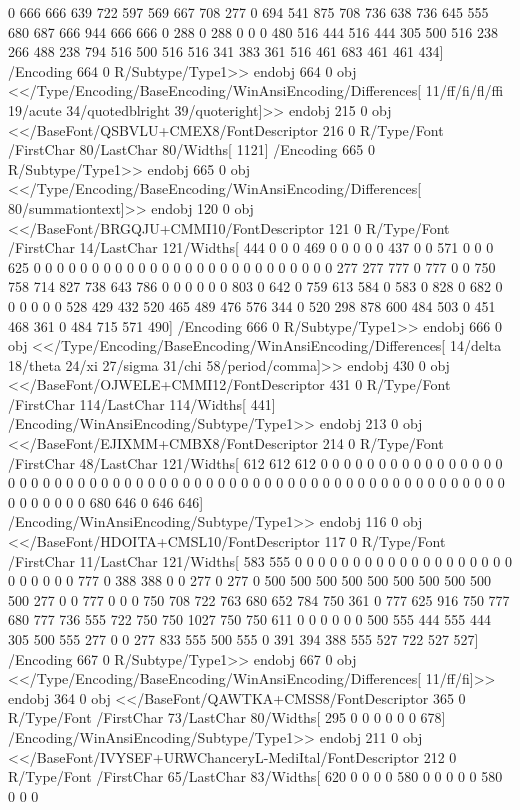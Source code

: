 {{{{{{{{{{{{{{{{{{{{{{{{{{{0 666 666 639 722 597 569 667 708 277 0 694 541 875 708 736
638 736 645 555 680 687 666 944 666 666 0 288 0 288 0 0
0 480 516 444 516 444 305 500 516 238 266 488 238 794 516 500
516 516 341 383 361 516 461 683 461 461 434]
/Encoding 664 0 R/Subtype/Type1>>
endobj
664 0 obj
<</Type/Encoding/BaseEncoding/WinAnsiEncoding/Differences[
11/ff/fi/fl/ffi
19/acute
34/quotedblright
39/quoteright]>>
endobj
215 0 obj
<</BaseFont/QSBVLU+CMEX8/FontDescriptor 216 0 R/Type/Font
/FirstChar 80/LastChar 80/Widths[
1121]
/Encoding 665 0 R/Subtype/Type1>>
endobj
665 0 obj
<</Type/Encoding/BaseEncoding/WinAnsiEncoding/Differences[
80/summationtext]>>
endobj
120 0 obj
<</BaseFont/BRGQJU+CMMI10/FontDescriptor 121 0 R/Type/Font
/FirstChar 14/LastChar 121/Widths[ 444 0
0 0 469 0 0 0 0 0 437 0 0 571 0 0 0 625
0 0 0 0 0 0 0 0 0 0 0 0 0 0 0 0
0 0 0 0 0 0 0 0 0 0 277 277 777 0 777 0
0 750 758 714 827 738 643 786 0 0 0 0 0 0 803 0
642 0 759 613 584 0 583 0 828 0 682 0 0 0 0 0
0 528 429 432 520 465 489 476 576 344 0 520 298 878 600 484
503 0 451 468 361 0 484 715 571 490]
/Encoding 666 0 R/Subtype/Type1>>
endobj
666 0 obj
<</Type/Encoding/BaseEncoding/WinAnsiEncoding/Differences[
14/delta
18/theta
24/xi
27/sigma
31/chi
58/period/comma]>>
endobj
430 0 obj
<</BaseFont/OJWELE+CMMI12/FontDescriptor 431 0 R/Type/Font
/FirstChar 114/LastChar 114/Widths[ 441]
/Encoding/WinAnsiEncoding/Subtype/Type1>>
endobj
213 0 obj
<</BaseFont/EJIXMM+CMBX8/FontDescriptor 214 0 R/Type/Font
/FirstChar 48/LastChar 121/Widths[
612 612 612 0 0 0 0 0 0 0 0 0 0 0 0 0
0 0 0 0 0 0 0 0 0 0 0 0 0 0 0 0
0 0 0 0 0 0 0 0 0 0 0 0 0 0 0 0
0 0 0 0 0 0 0 0 0 0 0 0 0 0 0 0
0 0 0 0 0 680 646 0 646 646]
/Encoding/WinAnsiEncoding/Subtype/Type1>>
endobj
116 0 obj
<</BaseFont/HDOITA+CMSL10/FontDescriptor 117 0 R/Type/Font
/FirstChar 11/LastChar 121/Widths[ 583 555 0 0 0
0 0 0 0 0 0 0 0 0 0 0 0 0 0 0 0
0 0 0 0 0 0 777 0 388 388 0 0 277 0 277 0
500 500 500 500 500 500 500 500 500 500 277 0 0 777 0 0
0 750 708 722 763 680 652 784 750 361 0 777 625 916 750 777
680 777 736 555 722 750 750 1027 750 750 611 0 0 0 0 0
0 500 555 444 555 444 305 500 555 277 0 0 277 833 555 500
555 0 391 394 388 555 527 722 527 527]
/Encoding 667 0 R/Subtype/Type1>>
endobj
667 0 obj
<</Type/Encoding/BaseEncoding/WinAnsiEncoding/Differences[
11/ff/fi]>>
endobj
364 0 obj
<</BaseFont/QAWTKA+CMSS8/FontDescriptor 365 0 R/Type/Font
/FirstChar 73/LastChar 80/Widths[ 295 0 0 0 0 0 0
678]
/Encoding/WinAnsiEncoding/Subtype/Type1>>
endobj
211 0 obj
<</BaseFont/IVYSEF+URWChanceryL-MediItal/FontDescriptor 212 0 R/Type/Font
/FirstChar 65/LastChar 83/Widths[ 620 0 0 0 0 580 0 0 0 0 0 580 0 0 0
}}}}}}}}}}}}}}}}}}}}}}}}}}}
